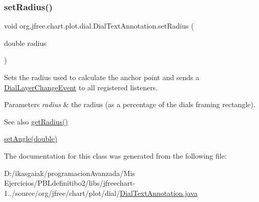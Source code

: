 \subsubsection{\texorpdfstring{set\+Radius()}{setRadius()}}
{\footnotesize\ttfamily void org.\+jfree.\+chart.\+plot.\+dial.\+Dial\+Text\+Annotation.\+set\+Radius (\begin{DoxyParamCaption}\item[{double}]{radius }\end{DoxyParamCaption})}

Sets the radius used to calculate the anchor point and sends a \mbox{\hyperlink{classorg_1_1jfree_1_1chart_1_1plot_1_1dial_1_1_dial_layer_change_event}{Dial\+Layer\+Change\+Event}} to all registered listeners.


\begin{DoxyParams}{Parameters}
{\em radius} & the radius (as a percentage of the dial\textquotesingle{}s framing rectangle).\\
\hline
\end{DoxyParams}
\begin{DoxySeeAlso}{See also}
\mbox{\hyperlink{classorg_1_1jfree_1_1chart_1_1plot_1_1dial_1_1_dial_text_annotation_a67f7b7e58b013b48901d0d80a22bbef5}{get\+Radius()}} 

\mbox{\hyperlink{classorg_1_1jfree_1_1chart_1_1plot_1_1dial_1_1_dial_text_annotation_a10212bd12fd87d4c9c8a89658fea5d09}{set\+Angle(double)}} 
\end{DoxySeeAlso}


The documentation for this class was generated from the following file\+:\begin{DoxyCompactItemize}
\item 
D\+:/ikasgaiak/programacion\+Avanzada/\+Mis Ejercicios/\+P\+B\+Ldefinitibo2/libs/jfreechart-\/1../source/org/jfree/chart/plot/dial/\mbox{\hyperlink{_dial_text_annotation_8java}{Dial\+Text\+Annotation.\+java}}\end{DoxyCompactItemize}
